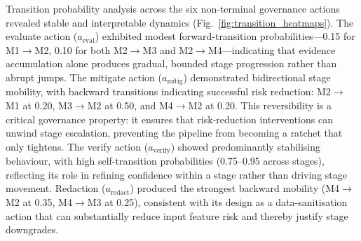 \documentclass{article}
\begin{document}
Transition probability analysis across the six non-terminal governance actions revealed stable and interpretable dynamics (Fig.~\ref{fig:transition_heatmaps}). The evaluate action ($a_{\mathrm{eval}}$) exhibited modest forward-transition probabilities—0.15 for M1$\to$M2, 0.10 for both M2$\to$M3 and M2$\to$M4—indicating that evidence accumulation alone produces gradual, bounded stage progression rather than abrupt jumps. The mitigate action ($a_{\mathrm{mitig}}$) demonstrated bidirectional stage mobility, with backward transitions indicating successful risk reduction: M2$\to$M1 at 0.20, M3$\to$M2 at 0.50, and M4$\to$M2 at 0.20. This reversibility is a critical governance property: it ensures that risk-reduction interventions can unwind stage escalation, preventing the pipeline from becoming a ratchet that only tightens. The verify action ($a_{\mathrm{verify}}$) showed predominantly stabilising behaviour, with high self-transition probabilities (0.75--0.95 across stages), reflecting its role in refining confidence within a stage rather than driving stage movement. Redaction ($a_{\mathrm{redact}}$) produced the strongest backward mobility (M4$\to$M2 at 0.35, M4$\to$M3 at 0.25), consistent with its design as a data-sanitisation action that can substantially reduce input feature risk and thereby justify stage downgrades.
\end{document}
